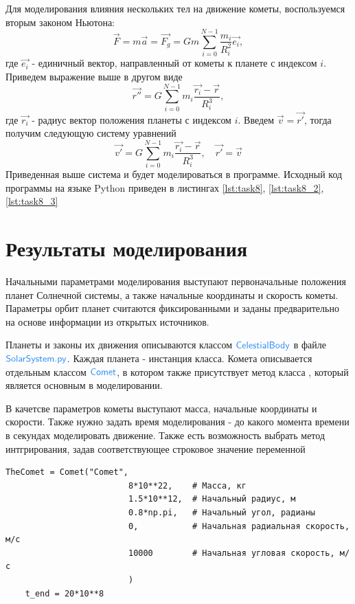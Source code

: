 Для моделирования влияния нескольких тел на движение кометы, воспользуемся вторым законом Ньютона:
\begin{equation}
	\vec{F} = m\vec{a} = \vec{F_g} = G m \sum_{i=0}^{N-1}\frac{m_i}{R_i^2}\vec{e_i},
\end{equation}
где $\vec{e_i}$ - единичный вектор, направленный от кометы к планете с индексом $i$.
Приведем выражение выше в другом виде
\begin{equation}
    \vec{r''} = G \sum_{i=0}^{N-1}m_i\frac{\vec{r_i}-\vec{r}}{R_i^3},
\end{equation}
где $\vec{r_i}$ - радиус вектор положения планеты с индексом $i$. Введем $\vec{v} = \vec{r'}$,
тогда получим следующую систему уравнений
\begin{equation}
	\vec{v'} = G \sum_{i=0}^{N-1}m_i\frac{\vec{r_i}-\vec{r}}{R_i^3}, \quad
	\vec{r'} = \vec{v}
\end{equation}
Приведенная выше система и будет моделироваться в программе. Исходный код программы на языке Python приведен в листингах
\ref{lst:task8}, \ref{lst:task8_2}, \ref{lst:task8_3}

\section{Результаты моделирования}
Начальными параметрами моделирования выступают первоначальные положения планет Солнечной системы,
а также начальные координаты и скорость кометы. Параметры орбит планет считаются фиксированными и заданы предварительно
на основе информации из открытых источников.

Планеты и законы их движения описываются классом $\cdw{CelestialBody}$ в файле $\cdw{SolarSystem.py}$.
Каждая планета - инстанция класса. Комета описывается отдельным классом $\cdw{Comet}$, в котором также 
присутствует метод класса , который является основным в моделировании.

В качетсве параметров кометы выступают масса, начальные координаты и скорости. Также нужно задать время моделирования
 - до какого момента времени в секундах моделировать движение. Также есть возможность выбрать метод
интгрирования, задав соответствующее строковое значение переменной 
\begin{lstlisting}[caption={Блок параметров симуляции},captionpos=b]
	TheComet = Comet("Comet",
                         8*10**22,    # Масса, кг
                         1.5*10**12,  # Начальный радиус, м
                         0.8*np.pi,   # Начальный угол, радианы
                         0,           # Начальная радиальная скорость, м/c
                         10000        # Начальная угловая скорость, м/с
				         )
	t_end = 20*10**8
\end{lstlisting}
